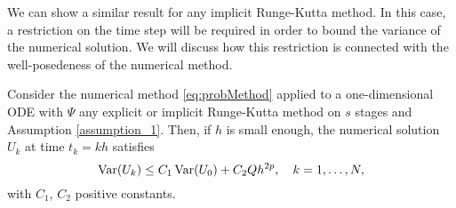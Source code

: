 \noindent We can show a similar result for any implicit Runge-Kutta method. In this case, a restriction on the time step will be required in order to bound the variance of the numerical solution. We will discuss how this restriction is connected with the well-posedeness of the numerical method.
\begin{lemma}\label{lem:varimRK} Consider the numerical method \eqref{eq:probMethod} applied to a one-dimensional ODE with $\Psi$ any explicit or implicit Runge-Kutta method on $s$ stages and Assumption \ref{assumption_1}. Then, if $h$ is small enough, the numerical solution $U_k$ at time $t_k = kh$ satisfies
	\begin{equation}
	\operatorname{Var}(U_k) \leq C_1\operatorname{Var}(U_0) + C_2Q h^{2p}, \quad k = 1, \ldots, N,
	\end{equation}
	with $C_1$, $C_2$ positive constants.
\end{lemma}
